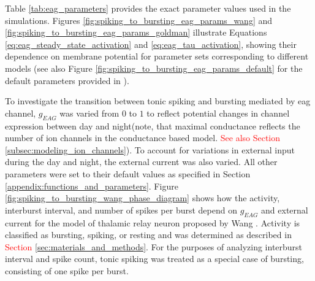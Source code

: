 \documentclass[../main.tex]{subfiles}
\begin{document}
Table \ref{tab:eag_parameters} provides the exact parameter values used in the simulations. Figures \ref{fig:spiking_to_bursting_eag_params_wang} and \ref{fig:spiking_to_bursting_eag_params_goldman} illustrate Equations \ref{eq:eag_steady_state_activation} and \ref{eq:eag_tau_activation}, showing their dependence on membrane potential for parameter sets corresponding to different models (see also Figure \ref{fig:spiking_to_bursting_eag_params_default} for the default parameters provided in \parencite{bronkRegulationEagCa22018}).

To investigate the transition between tonic spiking and bursting mediated by \gls{eag} channel, $g_{EAG}$ was varied from $0$ to $1$ to reflect potential changes in channel expression between day and night(note, that maximal conductance reflects the number of ion channels in the conductance based model. \textcolor{red}{See also Section \ref{subsec:modeling_ion_channels}}). To account for variations in external input during the day and night, the external current was also varied. All other parameters were set to their default values as specified in Section \ref{appendix:functions_and_parameters}. Figure \ref{fig:spiking_to_bursting_wang_phase_diagram} shows how the activity, interburst interval, and number of spikes per burst depend on $g_{EAG}$ and external current for the model of thalamic relay neuron proposed by Wang \parencite{wangMultipleDynamicalModes1994}. Activity is classified as bursting, spiking, or resting and was determined as described in \textcolor{red}{Section \ref{sec:materials_and_methods}}. For the purposes of analyzing interburst interval and spike count, tonic spiking was treated as a special case of bursting, consisting of one spike per burst.
\end{document}
